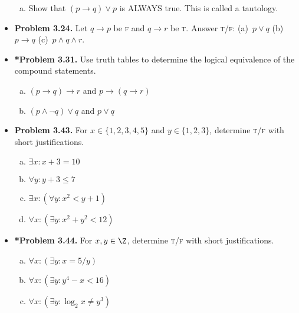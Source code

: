 \documentclass[11pt]{article}
\def\OR{\vee}
\def\AND{\wedge}
\def\imp{\rightarrow}
\begin{document}
\begin{itemize}
\begin{enumerate}[(a)]
  \item Show that $(p\imp q)\OR p$ is ALWAYS true.
    This is called a tautology.
  \end{enumerate}

\vspace{0.1in}

\item \textbf{Problem 3.24.}
  Let $q\imp p$ be \textsc{f} and $q\imp r$ be \textsc{t}.
  Answer \textsc{t}/\textsc{f}: (a)~$p\OR q$ (b)~$p\imp q$ (c)~$p\AND q\AND r$.

\vspace{0.1in}

\item \textbf{*Problem 3.31.}
  Use truth tables to determine the logical equivalence of the compound statements.
  \begin{multicols}{2}
  \begin{enumerate}[(a)]
  \item $(p\imp q)\imp r$ and $p\imp (q\imp r)$
  \item $(p\AND\neg q)\OR q$ and $p\OR q$
  \end{enumerate}
  \end{multicols}

\vspace{0.1in}

\item \textbf{Problem 3.43.}
  For $x\in\{1,2,3,4,5\}$ and $y\in\{1,2,3\}$,
  determine \textsc{t}/\textsc{f} with short justifications.
  \begin{enumerate}[(a)]
  \item $\exists x:x+3=10$
  \item $\forall y:y+3\le7$
  \item $\exists x:(\forall y:x^2<y+1)$
  \item $\forall x:(\exists y:x^2+y^2<12)$
  \end{enumerate}

\vspace{0.1in}

\item \textbf{*Problem 3.44.}
  For $x,y\in\Z$, determine \textsc{t}/\textsc{f} with short justifications.
  \begin{enumerate}[(a)]
  \item $\forall x:(\exists y:x=5/y)$
  \item $\forall x:(\exists y:y^4-x<16)$
  \item $\forall x:(\exists y:\log_2 x\ne y^3)$
  \end{enumerate}


\end{itemize}
\end{document}
